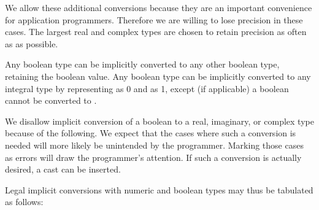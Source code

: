 
\begin{rationale}
We allow these additional conversions because they are an important
convenience for application programmers. Therefore we are willing to
lose precision in these cases. The largest real and complex types
are chosen to retain precision as often as as possible.
\end{rationale}

Any boolean type can be implicitly converted to any other boolean type,
retaining the boolean value.
Any boolean type can be implicitly converted to any integral type
by representing  as 0 and  as 1,
except (if applicable)
a boolean cannot be converted to .

\begin{rationale}
We disallow implicit conversion of a boolean to
a real, imaginary, or complex type because of the following.
We expect that the cases where such a conversion is needed
will more likely be unintended by the programmer.
Marking those cases as errors will draw the programmer's attention.
If such a conversion is actually desired, a cast 
can be inserted.
\end{rationale}

Legal implicit conversions with numeric and boolean types
may thus be tabulated as follows:

